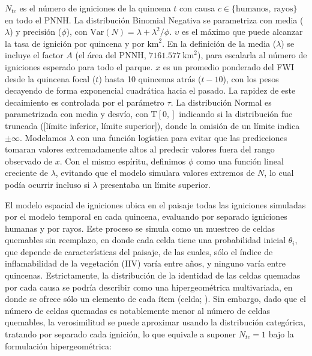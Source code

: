 \noindent $N_{tc}$ es el número de igniciones de la quincena $t$ con causa $c \in \{\text{humanos, rayos}\}$ en todo el PNNH. La distribución Binomial Negativa se parametriza con media ($\lambda$) y precisión ($\phi$), con $\text{Var}(N) = \lambda + \lambda^2 / \phi$. $\upsilon$ es el máximo que puede alcanzar la tasa de ignición por quincena y por $\text{km}^2$. En la definición de la media ($\lambda$) se incluye el factor $A$ (el área del PNNH, $7161.577\ \text{km}^2$), para escalarla al número de igniciones esperado para todo el parque. $x$ es un promedio ponderado del FWI desde la quincena focal ($t$) hasta 10 quincenas atrás ($t-10$), con los pesos decayendo de forma exponencial cuadrática hacia el pasado. La rapidez de este decaimiento es controlada por el parámetro $\tau$. La distribución Normal es parametrizada con media y desvío, con $\text{T}[0, ]$ indicando si la distribución fue truncada ([límite inferior, límite superior]), donde la omisión de un límite indica $\pm\infty$. Modelamos $\lambda$ con una función logística para evitar que las predicciones tomaran valores extremadamente altos al predecir valores fuera del rango observado de $x$. Con el mismo espíritu, definimos $\phi$ como una función lineal creciente de $\lambda$, evitando que el modelo simulara valores extremos de $N$, lo cual podía ocurrir incluso si $\lambda$ presentaba un límite superior.

El modelo espacial de igniciones ubica en el paisaje todas las igniciones simuladas por el modelo temporal en cada quincena, evaluando por separado igniciones humanas y por rayos. Este proceso se simula como un muestreo de celdas quemables sin reemplazo, en donde cada celda tiene una probabilidad inicial $\theta_i$, que depende de características del paisaje, de las cuales, sólo el índice de inflamabilidad de la vegetación (IIV) varía entre años, y ninguno varía entre quincenas. Estrictamente, la distribución de la identidad de las celdas quemadas por cada causa se podría describir como una hipergeométrica multivariada, en donde se ofrece sólo un elemento de cada ítem (celda; \citealt{fog2008calculation}). Sin embargo, dado que el número de celdas quemadas es notablemente menor al número de celdas quemables, la verosimilitud se puede aproximar usando la distribución categórica, tratando por separado cada ignición, lo que equivale a suponer $N_{tc} = 1$ bajo la formulación hipergeométrica:

